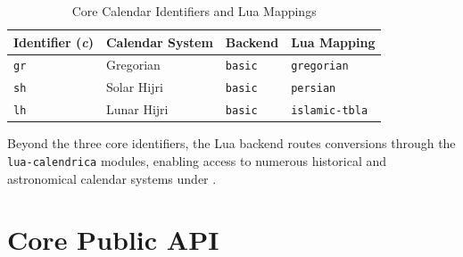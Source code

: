 \documentclass[10pt]{article}
\newcommand{\LuaLaTeXLogo}{\hologo{LuaLaTeX}}
\begin{document}
\begin{table}[h!]
    \caption{Core Calendar Identifiers and Lua Mappings}
    \label{tab:core-calendars}
    \vspace{2pt}
    \centering\small
    \begin{tabular}{llll}
        \toprule
        \textbf{Identifier (\textit{c})} &
        \textbf{Calendar System}         &
        \textbf{Backend}                 &
        \textbf{Lua Mapping}               \\
        \midrule

        \texttt{gr}                      &
        Gregorian                        &
        \texttt{basic}                   &
        \texttt{gregorian}                 \\

        \texttt{sh}                      &
        Solar Hijri                      &
        \texttt{basic}                   &
        \texttt{persian}                   \\

        \texttt{lh}                      &
        Lunar Hijri                      &
        \texttt{basic}                   &
        \texttt{islamic-tbla}             \\

        \bottomrule
    \end{tabular}
\end{table}


Beyond the three core identifiers, the Lua backend routes conversions through
the \texttt{lua-calendrica} modules, enabling access to numerous historical and
astronomical calendar systems under \LuaLaTeXLogo{}.




\section{Core Public API}
\end{document}
